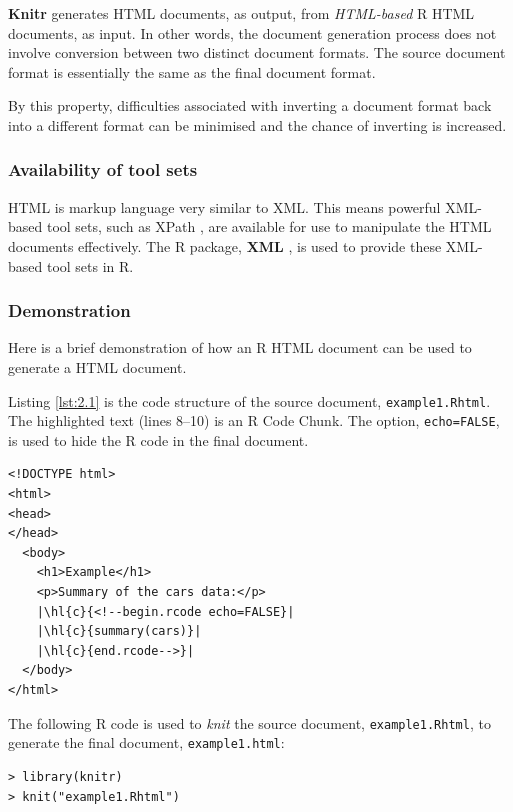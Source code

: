 \documentclass[a4paper, 12pt]{report}
\begin{document}
\textbf{Knitr} generates HTML documents, as output, from \emph{HTML-based} R HTML documents, as input. In other words, the document generation process does not involve conversion between two distinct document formats. The source document format is essentially the same as the final document format.

By this property, difficulties associated with inverting a document format back into a different format can be minimised and the chance of inverting is increased.

\subsubsection*{Availability of tool sets}
HTML is markup language very similar to XML. This means powerful XML-based tool sets, such as XPath \citep{xpath}, are available for use to manipulate the HTML documents effectively. The R package, \textbf{XML} \citep{xml}, is used to provide these XML-based tool sets in R.

\subsubsection*{Demonstration}
Here is a brief demonstration of how an R HTML document can be used to generate a HTML document.

Listing \ref{lst:2.1} is the code structure of the source document, \texttt{example1.Rhtml}. The highlighted text (lines 8--10) is an R Code Chunk. The option, \texttt{echo=FALSE}, is used to hide the R code in the final document.
\newcommand{\hl}[3][black]{{\fboxsep0.5pt\colorbox{#2}{\color{#1} #3}}}
\begin{lstlisting}[caption={\texttt{example1.Rhtml}}, escapechar=\|, label={lst:2.1}]
<!DOCTYPE html>
<html>
<head>
</head>
  <body>
    <h1>Example</h1>
    <p>Summary of the cars data:</p>
    |\hl{c}{<!--begin.rcode echo=FALSE}|
    |\hl{c}{summary(cars)}|
    |\hl{c}{end.rcode-->}|
  </body>
</html>
\end{lstlisting}

The following R code is used to \emph{knit} the source document, \texttt{example1.Rhtml}, to generate the final document, \texttt{example1.html}:
\begin{lstlisting}[numbers=none, frame=none]
> library(knitr)
> knit("example1.Rhtml")
\end{lstlisting}
\end{document}
